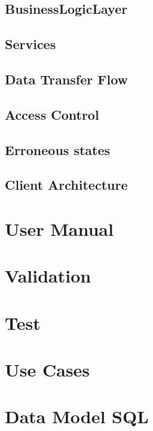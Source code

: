 \documentclass{report}
\begin{document}


\section{BusinessLogicLayer}



\section{Services}


\section{Data Transfer Flow}



% 

\section{Access Control}



\section{Erroneous states}





\section{Client Architecture}




\chapter{User Manual}

\chapter{Validation}


\chapter{Test}
\appendix
\chapter{Use Cases}

\chapter{Data Model SQL}

\end{document}
